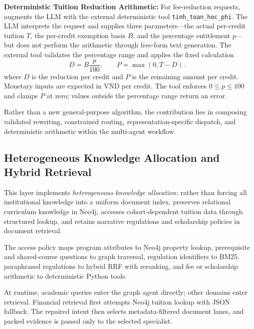 \textbf{Deterministic Tuition Reduction Arithmetic:}
For fee-reduction requests, \system{} augments the LLM with the external deterministic tool \texttt{tinh\_toan\_hoc\_phi}. The LLM interprets the request and supplies three parameters---the actual per-credit tuition $T$, the per-credit exemption basis $B$, and the percentage entitlement $p$---but does not perform the arithmetic through free-form text generation. The external tool validates the percentage range and applies the fixed calculation
\begin{equation}
  D = B\frac{p}{100}, \qquad P = \max(0, T-D).
  \label{eq:tuition_reduction}
\end{equation}
where $D$ is the reduction per credit and $P$ is the remaining amount per credit. Monetary inputs are expected in VND per credit. The tool enforces $0 \le p \le 100$ and clamps $P$ at zero; values outside the percentage range return an error.

Rather than a new general-purpose algorithm, the contribution lies in composing validated rewriting, constrained routing, representation-specific dispatch, and deterministic arithmetic within the multi-agent workflow.

\subsection{Heterogeneous Knowledge Allocation and Hybrid Retrieval}
\label{sec:hybrid_retrieval}

This layer implements \emph{heterogeneous knowledge allocation}: rather than forcing all institutional knowledge into a uniform document index, \system{} preserves relational curriculum knowledge in Neo4j, accesses cohort-dependent tuition data through structured lookup, and retains narrative regulations and scholarship policies in document retrieval.

The access policy maps program attributes to Neo4j property lookup, prerequisite and shared-course questions to graph traversal, regulation identifiers to BM25, paraphrased regulations to hybrid RRF with reranking, and fee or scholarship arithmetic to deterministic Python tools.

At runtime, academic queries enter the graph agent directly; other domains enter retrieval. Financial retrieval first attempts Neo4j tuition lookup with JSON fallback. The repaired intent then selects metadata-filtered document lanes, and packed evidence is passed only to the selected specialist.

